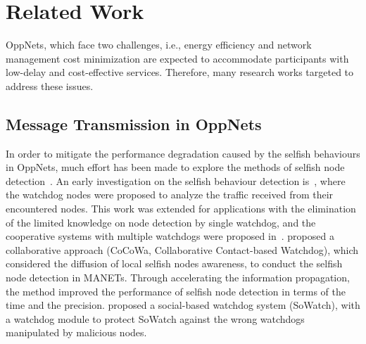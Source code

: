 \section{Related Work}
\label{sec:related}
OppNets, which face two challenges,
i.e., energy efficiency and network management cost minimization
are expected to accommodate participants
with low-delay and cost-effective services.
Therefore, many research works targeted to address these issues.

\subsection{Message Transmission in OppNets}
In order to mitigate the performance degradation caused by
the selfish behaviours in OppNets,
much effort has been made to explore
the methods of selfish node
detection~\cite{DBLP:journals/tvt/LiSWJSZ11, DBLP:journals/comsur/JedariXN18}.
An early investigation on the selfish behaviour detection
is~\cite{DBLP:conf/mobicom/MartiGLB00},
where the watchdog nodes were proposed
to analyze the traffic received from their encountered nodes.
This work was extended for applications with
the elimination of the limited knowledge on node detection by single watchdog,
and the cooperative systems with multiple watchdogs were proposed
in~\cite{DBLP:journals/tmc/Hernandez-Orallo15, DBLP:journals/tie/DiasRXM15,
DBLP:journals/fgcs/JedariXCDTA19}.
\cite{DBLP:journals/tmc/Hernandez-Orallo15} proposed
a collaborative approach (CoCoWa, Collaborative Contact-based Watchdog),
which considered the diffusion of local selfish nodes awareness,
to conduct the selfish node detection in MANETs.
Through accelerating the information propagation,
the method improved the performance of selfish node detection
in terms of the time and the precision.
\cite{DBLP:journals/fgcs/JedariXCDTA19} proposed
a social-based watchdog system (SoWatch),
with a watchdog module to protect SoWatch
against the wrong watchdogs manipulated by malicious nodes.

